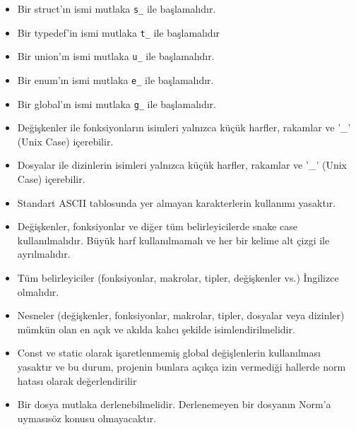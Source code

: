 \documentclass{42-en}
\begin{document}
        \begin{itemize}

            \item Bir struct’ın ismi mutlaka \texttt{s\_} ile başlamalıdır.

            \item Bir typedef’in ismi mutlaka \texttt{t\_} ile başlamalıdır

            \item Bir union’ın ismi mutlaka \texttt{u\_} ile başlamalıdır.

            \item Bir enum’ın ismi mutlaka \texttt{e\_} ile başlamalıdır.

            \item Bir global’ın ismi mutlaka \texttt{g\_} ile başlamalıdır.

            \item Değişkenler ile fonksiyonların isimleri yalnızca küçük harfler, rakamlar ve '\_' (Unix Case) içerebilir.

            \item Dosyalar ile dizinlerin isimleri yalnızca küçük harfler, rakamlar ve '\_' (Unix Case) içerebilir.

            \item Standart ASCII tablosunda yer almayan karakterlerin kullanımı yasaktır.

            \item Değişkenler, fonksiyonlar ve diğer tüm belirleyicilerde snake case kullanılmalıdır. Büyük harf kullanılmamalı ve her bir kelime alt çizgi ile ayrılmalıdır.

            \item Tüm belirleyiciler (fonksiyonlar, makrolar, tipler, değişkenler vs.) İngilizce olmalıdır.

            \item Nesneler (değişkenler, fonksiyonlar, makrolar, tipler, dosyalar veya dizinler) mümkün olan en açık ve
akılda kalıcı şekilde isimlendirilmelidir.

            \item Const ve static olarak işaretlenmemiş global değişlenlerin kullanılması yasaktır ve bu durum, projenin
bunlara açıkça izin vermediği hallerde norm hatası olarak değerlendirilir

            \item Bir dosya mutlaka derlenebilmelidir. Derlenemeyen bir dosyanın Norm’a uymasısöz konusu olmayacaktır.

        \end{itemize}
\newpage
\end{document}
